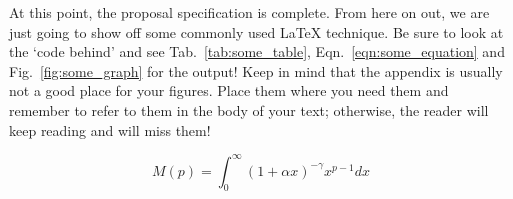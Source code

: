 \documentclass{sig-alternate}
\begin{document}
At this point, the proposal specification is complete. From here on
out, we are just going to show off some commonly used \LaTeX{}
technique. Be sure to look at the `code behind' and see
Tab.~\ref{tab:some_table}, Eqn.~\ref{eqn:some_equation} and
Fig.~\ref{fig:some_graph} for the output! Keep in mind that the
appendix is usually not a good place for your figures. Place them
where you need them and remember to refer to them in the body of your
text; otherwise, the reader will keep reading and will miss them!

\begin{equation}
M(p) = \int^\infty_0 (1+\alpha x)^{-\gamma}x^{p-1}dx
\label{eqn:some_equation}
\end{equation}

\end{document}
